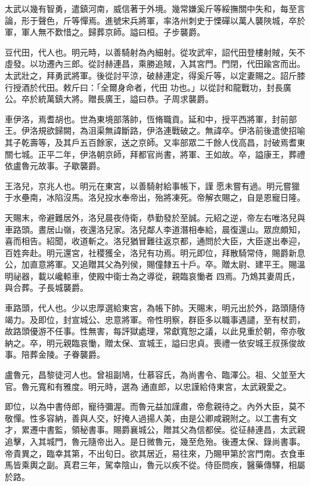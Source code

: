 \begin{pinyinscope}
 太武以幾有智勇，遣鎮河南，威信著于外境。幾常嫌奚斤等綏撫關中失和，每至言論，形于聲色，斤等憚焉。進號宋兵將軍，率洛州刺史于慄磾以萬人襲陜城，卒於軍，軍人無不歎惜之。歸葬京師。謚曰桓。子步襲爵。



 豆代田，代人也。明元時，以善騎射為內細射。從攻武牢，詔代田登樓射賊，矢不虛發。以功遷內三郎。從討赫連昌，乘勝追賊，入其宮門。門閉，代田踰宮而出。太武壯之，拜勇武將軍。後從討平涼，破赫連定，得奚斤等，以定妻賜之。詔斤膝行授酒於代田。敕斤曰：「全爾身命者，代田
 功也。」以從討和龍戰功，封長廣公。卒於統萬鎮大將。贈長廣王，謚曰恭。子周求襲爵。



 車伊洛，焉耆胡也。世為東境部落帥，恆脩職貢。延和中，授平西將軍，封前部王。伊洛規欲歸闕，為沮渠無諱斷路，伊洛連戰破之。無諱卒。伊洛前後遣使招喻其子乾壽等，及其戶五百餘家，送之京師。又率部眾二千餘人伐高昌，討破焉耆東關七城。正平二年，伊洛朝京師，拜都官尚書，將軍、王如故。卒，謚康王，葬禮依盧魯元故事。子歇襲爵。



 王洛兒，京兆人也。明元在東宮，以善騎射給事帳下，謹
 愿未嘗有過。明元嘗獵于水壘南，冰陷沒馬。洛兒投水奉帝出，殆將凍死。帝解衣賜之，自是恩寵日隆。



 天賜末，帝避難居外，洛兒晨夜侍衛，恭勤發於至誠。元紹之逆，帝左右唯洛兒與車路頭。晝居山嶺，夜還洛兒家。洛兒鄰人李道潛相奉給，晨復還山。眾庶頗知，喜而相告。紹聞，收道斬之。洛兒猶冒難往返京都，通問於大臣，大臣遂出奉迎，百姓奔赴。明元還宮，社稷獲全，洛兒有功焉。明元即位，拜散騎常侍，賜爵新息公，加直意將軍。又追贈其父為列侯，賜僮隸五十戶。卒。贈太尉、建平王。賜溫明祕器，載以巉輬車，使殿中衛士為之導從，親臨哀慟者
 四焉。乃鴆其妻周氏，與合葬。子長城襲爵。



 車路頭，代人也。少以忠厚選給東宮，為帳下帥。天賜末，明元出於外，路頭隨侍竭力。及即位，封宣城公、忠意將軍。帝性明察，群臣多以職事遇譴，至有杖罰，故路頭優游不任事。性無害，每評獄處理，常獻寬恕之議，以此見重於朝，帝亦敬納之。卒，明元親臨哀慟，贈太保、宣城王，謚曰忠貞。喪禮一依安城王叔孫俊故事。陪葬金陵。子眷襲爵。



 盧魯元，昌黎徒河人也。曾祖副鳩，仕慕容氏，為尚書令、臨澤公。祖、父並至大官。魯元寬和有雅度。明元時，選為
 通直郎，以忠謹給侍東宮，太武親愛之。



 即位，以為中書侍郎，寵待彌渥。而魯元益加謹肅，帝愈親待之。內外大臣，莫不敬憚。性多容納，善與人交，好掩人過揚人美，由是公卿咸親附之。以工書有文才，累遷中書監，領秘書事。賜爵襄城公，贈其父為信都侯。從征赫連昌，太武親追擊，入其城門，魯元隨帝出入。是日微魯元，幾至危殆。後遷太保、錄尚書事。帝貴異之，臨幸其第，不出旬日。欲其居近，易往來，乃賜甲第於宮門南。衣食車馬皆乘輿之副。真君三年，駕幸陰山，魯元以疾不從。侍臣問疾，醫藥傳驛，相屬於路。




\end{pinyinscope}
